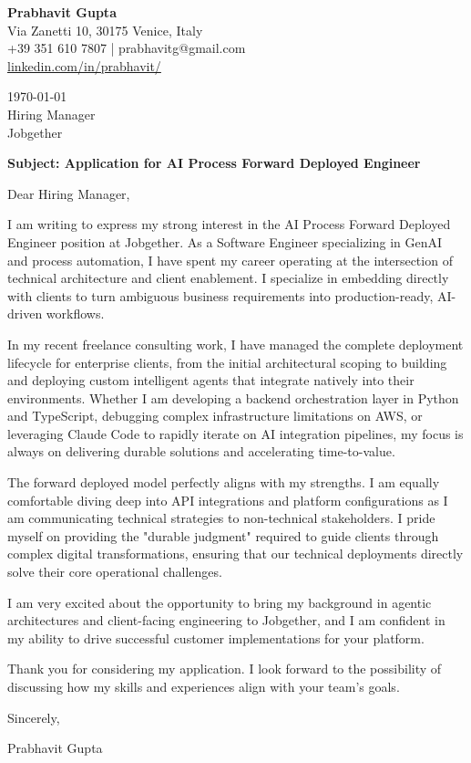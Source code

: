 \documentclass[11pt,a4paper]{article}
\begin{document}
\begin{flushleft}
\textbf{Prabhavit Gupta}\\
Via Zanetti 10, 30175 Venice, Italy\\
+39 351 610 7807 | prabhavitg@gmail.com\\
\href{https://www.linkedin.com/in/prabhavit/}{linkedin.com/in/prabhavit/}
\end{flushleft}

\vspace{2em}

\begin{flushleft}
\today\\
\vspace{1em}
Hiring Manager\\
Jobgether\\
\end{flushleft}

\vspace{1em}

\textbf{Subject: Application for AI Process Forward Deployed Engineer}

Dear Hiring Manager,

I am writing to express my strong interest in the AI Process Forward Deployed Engineer position at Jobgether. As a Software Engineer specializing in GenAI and process automation, I have spent my career operating at the intersection of technical architecture and client enablement. I specialize in embedding directly with clients to turn ambiguous business requirements into production-ready, AI-driven workflows.

In my recent freelance consulting work, I have managed the complete deployment lifecycle for enterprise clients, from the initial architectural scoping to building and deploying custom intelligent agents that integrate natively into their environments. Whether I am developing a backend orchestration layer in Python and TypeScript, debugging complex infrastructure limitations on AWS, or leveraging Claude Code to rapidly iterate on AI integration pipelines, my focus is always on delivering durable solutions and accelerating time-to-value. 

The forward deployed model perfectly aligns with my strengths. I am equally comfortable diving deep into API integrations and platform configurations as I am communicating technical strategies to non-technical stakeholders. I pride myself on providing the "durable judgment" required to guide clients through complex digital transformations, ensuring that our technical deployments directly solve their core operational challenges.

I am very excited about the opportunity to bring my background in agentic architectures and client-facing engineering to Jobgether, and I am confident in my ability to drive successful customer implementations for your platform.

Thank you for considering my application. I look forward to the possibility of discussing how my skills and experiences align with your team's goals.

Sincerely,

\vspace{1em}
Prabhavit Gupta
\end{document}
